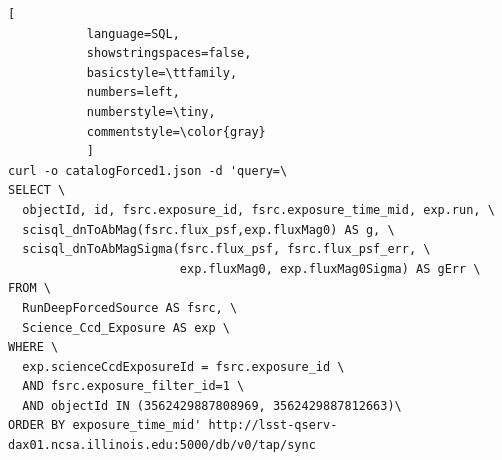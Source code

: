 \documentclass[fleqn,usenatbib]{mnras} %
\begin{document}
\begin{lstlisting}[
           language=SQL,
           showstringspaces=false,
           basicstyle=\ttfamily,
           numbers=left,
           numberstyle=\tiny,
           commentstyle=\color{gray}
           ]
curl -o catalogForced1.json -d 'query=\
SELECT \
  objectId, id, fsrc.exposure_id, fsrc.exposure_time_mid, exp.run, \
  scisql_dnToAbMag(fsrc.flux_psf,exp.fluxMag0) AS g, \
  scisql_dnToAbMagSigma(fsrc.flux_psf, fsrc.flux_psf_err, \
                        exp.fluxMag0, exp.fluxMag0Sigma) AS gErr \
FROM \
  RunDeepForcedSource AS fsrc, \
  Science_Ccd_Exposure AS exp \
WHERE \
  exp.scienceCcdExposureId = fsrc.exposure_id \
  AND fsrc.exposure_filter_id=1 \
  AND objectId IN (3562429887808969, 3562429887812663)\
ORDER BY exposure_time_mid' http://lsst-qserv-dax01.ncsa.illinois.edu:5000/db/v0/tap/sync

\end{lstlisting}




\bsp	%
\label{lastpage}
\end{document}
